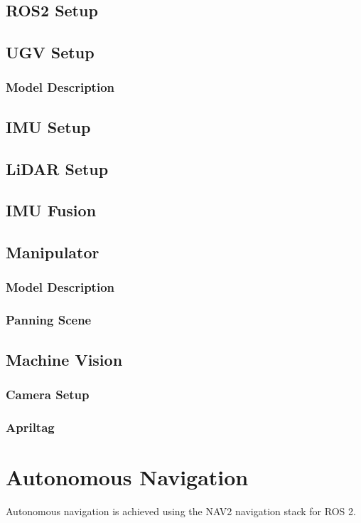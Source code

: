 \subsection{ROS2 Setup}

\subsection{UGV Setup}
\subsubsection{Model Description}

\subsection{IMU Setup}

\subsection{LiDAR Setup}

\subsection{IMU Fusion}

\subsection{Manipulator}
\subsubsection{Model Description}
\subsubsection{Panning Scene}

\subsection{Machine Vision}
\subsubsection{Camera Setup}
\subsubsection{Apriltag}


\section{Autonomous Navigation}
Autonomous navigation is achieved using the NAV2 navigation stack for ROS 2.

